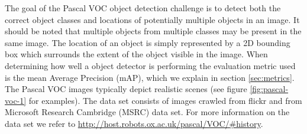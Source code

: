 \documentclass{article}
\begin{document}
The goal of the Pascal VOC object detection challenge is to detect both the correct object classes and locations of potentially multiple objects in an image. It should be noted that multiple objects from multiple classes may be present in the same image. The location of an object is simply represented by a 2D bounding box which surrounds the extent of the object visible in the image. When determining how well a object detector is performing the evaluation metric used is the mean Average Precision (mAP), which we explain in section \ref{sec:metrics}. The Pascal VOC images typically depict realistic scenes (see figure \ref{fig:pascal-voc-1} for examples). The data set consists of images crawled from flickr and from Microsoft Research Cambridge (MSRC) data set. For more information on the data set we refer to \url{http://host.robots.ox.ac.uk/pascal/VOC/#history}. 
\end{document}
